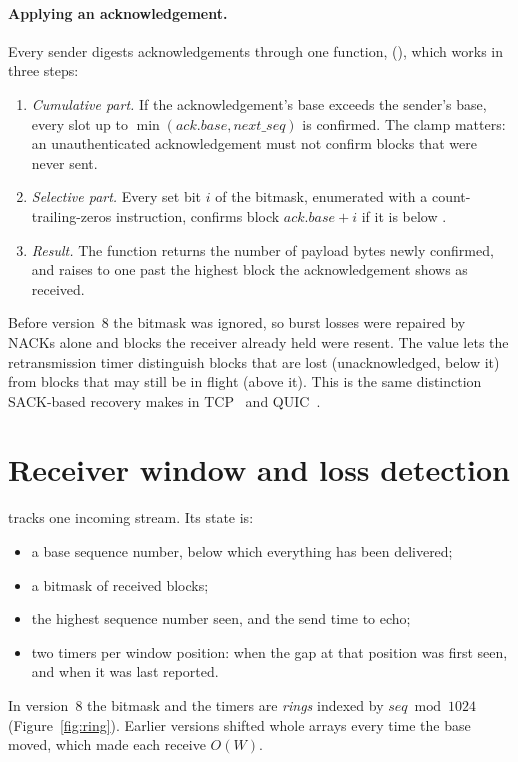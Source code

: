 \paragraph{Applying an acknowledgement\vviii.} Every sender digests acknowledgements through one function,
 (), which works in three steps:
\begin{enumerate}
  \item \emph{Cumulative part.} If the acknowledgement's base exceeds the sender's base, every slot up to
    $\min(\mathit{ack.base}, \mathit{next\_seq})$ is confirmed. The clamp matters: an unauthenticated
    acknowledgement must not confirm blocks that were never sent.
  \item \emph{Selective part.} Every set bit $i$ of the bitmask, enumerated with a count-trailing-zeros
    instruction, confirms block $\mathit{ack.base}+i$ if it is below .
  \item \emph{Result.} The function returns the number of payload bytes newly confirmed, and raises
     to one past the highest block the acknowledgement shows as received.
\end{enumerate}

Before version~8 the bitmask was ignored, so burst losses were repaired by NACKs alone and blocks the receiver
already held were resent. The  value lets the retransmission timer distinguish blocks that
are lost (unacknowledged, below it) from blocks that may still be in flight (above it). This is the same
distinction SACK-based recovery makes in TCP~\cite{rfc2018} and QUIC~\cite{rfc9002}.

\section{Receiver window and loss detection}\label{sec:receiver}

 tracks one incoming stream. Its state is:
\begin{itemize}
  \item a base sequence number, below which everything has been delivered;
  \item a bitmask of received blocks;
  \item the highest sequence number seen, and the send time to echo;
  \item two timers per window position: when the gap at that position was first seen, and when it was last
    reported.
\end{itemize}
In version~8 the bitmask and the timers are \emph{rings} indexed by $\mathit{seq}\bmod 1024$
(Figure~\ref{fig:ring}). Earlier versions shifted whole arrays every time the base moved, which made each
receive $O(W)$.

